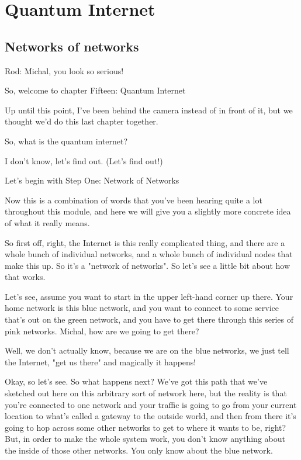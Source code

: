 \chapter{Quantum Internet}

\section{Networks of networks}

Rod: Michal, you look so serious!

So, welcome to chapter Fifteen: Quantum Internet

Up until this point, I've been behind the camera instead of in front of it, but we thought we'd do this last chapter together.

So, what is the quantum internet?

I don't know, let's find out. (Let's find out!)

Let's begin with Step One: Network of Networks

Now this is a combination of words that you've been hearing quite a lot throughout this module, and here we will give you a slightly more concrete idea of what it really means.

So first off, right, the Internet is this really complicated thing, and there are a whole bunch of individual networks, and a whole bunch of individual nodes that make this up. So it's a "network of networks". So let's see a little bit about how that works.

Let's see, assume you want to start in the upper left-hand corner up there. Your home network is this blue network, and you want to connect to some service that's out on the green network, and you have to get there through this series of pink networks. Michal, how are we going to get there?

Well, we don't actually know, because we are on the blue networks, we just tell the Internet, "get us there" and magically it happens!

Okay, so let's see. So what happens next? We've got this path that we've sketched out here on this arbitrary sort of network here, but the reality is that you're connected to one network and your traffic is going to go from your current location to what's called a gateway to the outside world, and then from there it's going to hop across some other networks to get to where it wants to be, right? But, in order to make the whole system work, you don't know anything about the inside of those other networks. You only know about the blue network.

